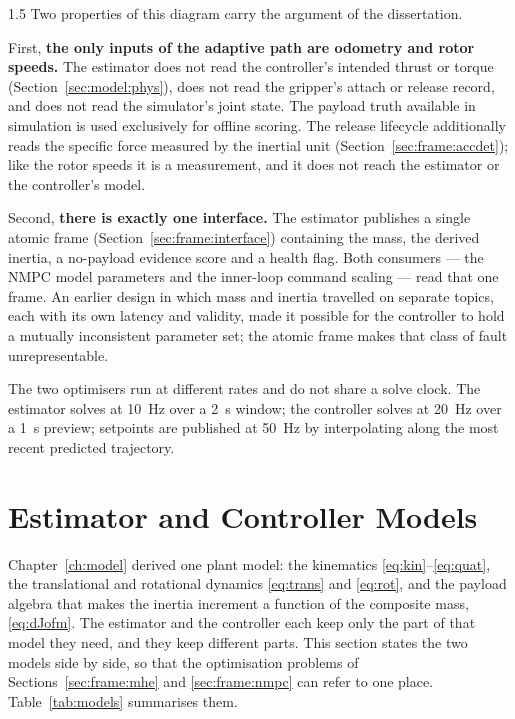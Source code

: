 \begin{spacing}{1.5}
Two properties of this diagram carry the argument of the dissertation.

First, \textbf{the only inputs of the adaptive path are odometry and rotor
speeds.} The estimator does not read the controller's intended thrust or torque
(Section~\ref{sec:model:phys}), does not read the gripper's attach or release
record, and does not read the simulator's joint state. The payload truth
available in simulation is used exclusively for offline scoring. The release
lifecycle additionally reads the specific force measured by the inertial unit
(Section~\ref{sec:frame:accdet}); like the rotor speeds it is a measurement, and
it does not reach the estimator or the controller's model.

Second, \textbf{there is exactly one interface.} The estimator publishes a single
atomic frame (Section~\ref{sec:frame:interface}) containing the mass, the derived
inertia, a no-payload evidence score and a health flag. Both consumers --- the NMPC model
parameters and the inner-loop command scaling --- read that one frame. An earlier
design in which mass and inertia travelled on separate topics, each with its own
latency and validity, made it possible for the controller to hold a mutually
inconsistent parameter set; the atomic frame makes that class of fault
unrepresentable.

The two optimisers run at different rates and do not share a solve clock. The
estimator solves at \SI{10}{\hertz} over a \SI{2}{\second} window; the controller
solves at \SI{20}{\hertz} over a \SI{1}{\second} preview; setpoints are published
at \SI{50}{\hertz} by interpolating along the most recent predicted trajectory.

\section{Estimator and Controller Models}\label{sec:frame:models}

Chapter~\ref{ch:model} derived one plant model: the kinematics
\eqref{eq:kin}--\eqref{eq:quat}, the translational and rotational dynamics
\eqref{eq:trans} and \eqref{eq:rot}, and the payload algebra that makes the
inertia increment a function of the composite mass, \eqref{eq:dJofm}. The
estimator and the controller each keep only the part of that model they need,
and they keep different parts. This section states the two models side by side,
so that the optimisation problems of Sections~\ref{sec:frame:mhe} and
\ref{sec:frame:nmpc} can refer to one place. Table~\ref{tab:models} summarises
them.


\end{spacing}
